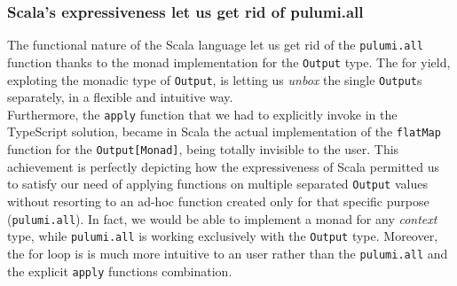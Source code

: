 \subsubsection{Scala's expressiveness let us get rid of pulumi.all}
The functional nature of the Scala language let us get rid of the \texttt{pulumi.all} function thanks to the monad implementation for the \texttt{Output} type.
The for yield, exploting the monadic type of \texttt{Output}, is letting us \textit{unbox} the single \texttt{Output}s separately, in a flexible and intuitive way.\\
Furthermore, the \texttt{apply} function that we had to explicitly invoke in the TypeScript solution, became in Scala the actual implementation of the \texttt{flatMap} function for the \texttt{Output[Monad]}, being totally invisible to the user.
This achievement is perfectly depicting how the expressiveness of Scala permitted us to satisfy our need of applying functions on multiple separated \texttt{Output} values without resorting to an ad-hoc function created only for that specific purpose (\texttt{pulumi.all}).
In fact, we would be able to implement a monad for any \textit{context} type, while \texttt{pulumi.all} is working exclusively with the \texttt{Output} type.
Moreover, the for loop is is much more intuitive to an user rather than the \texttt{pulumi.all} and the explicit \texttt{apply} functions combination.






